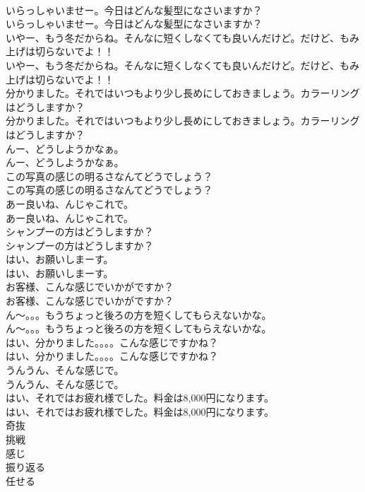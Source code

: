 \documentclass[8pt]{extreport}
\begin{document}
\begin{CJK}{UTF8}{min}
\\	いらっしゃいませー。今日はどんな髪型になさいますか？	
\\	いらっしゃいませー。今日はどんな髪型になさいますか？ 
\\	いやー、もう冬だからね。そんなに短くしなくても良いんだけど。だけど、もみ上げは切らないでよ！！	
\\	いやー、もう冬だからね。そんなに短くしなくても良いんだけど。だけど、もみ上げは切らないでよ！！ 
\\	分かりました。それではいつもより少し長めにしておきましょう。カラーリングはどうしますか？	
\\	分かりました。それではいつもより少し長めにしておきましょう。カラーリングはどうしますか？ 
\\	んー、どうしようかなぁ。	
\\	んー、どうしようかなぁ。 
\\	この写真の感じの明るさなんてどうでしょう？	
\\	この写真の感じの明るさなんてどうでしょう？ 
\\	あー良いね、んじゃこれで。	
\\	あー良いね、んじゃこれで。 
\\	シャンプーの方はどうしますか？	
\\	シャンプーの方はどうしますか？ 
\\	はい、お願いしまーす。	
\\	はい、お願いしまーす。 
\\	お客様、こんな感じでいかがですか？	
\\	お客様、こんな感じでいかがですか？ 
\\	ん～。。。もうちょっと後ろの方を短くしてもらえないかな。	
\\	ん～。。。もうちょっと後ろの方を短くしてもらえないかな。 
\\	はい、分かりました。。。。こんな感じですかね？	
\\	はい、分かりました。。。。こんな感じですかね？ 
\\	うんうん、そんな感じで。	
\\	うんうん、そんな感じで。 
\\	はい、それではお疲れ様でした。料金は8,000円になります。	
\\	はい、それではお疲れ様でした。料金は8,000円になります。 
\\	奇抜
\\	挑戦
\\	感じ
\\	振り返る
\\	任せる

\end{CJK}
\end{document}
